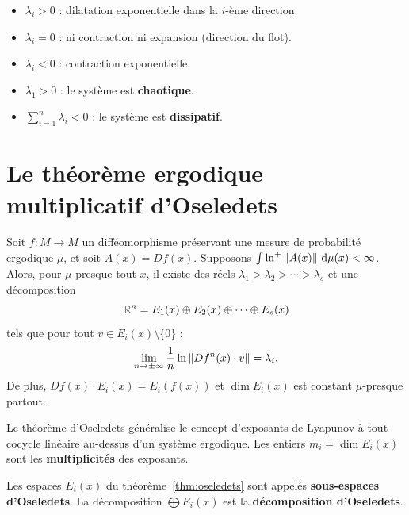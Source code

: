 \begin{formules}[title=\textbf{Interpr\'etation g\'eom\'etrique des exposants}]
\begin{itemize}
    \item $\lambda_i > 0$ : dilatation exponentielle dans la $i$-\`eme direction.
    \item $\lambda_i = 0$ : ni contraction ni expansion (direction du flot).
    \item $\lambda_i < 0$ : contraction exponentielle.
    \item $\lambda_1 > 0$ : le syst\`eme est \textbf{chaotique}.
    \item $\sum_{i=1}^n \lambda_i < 0$ : le syst\`eme est \textbf{dissipatif}.
\end{itemize}
\end{formules}

\section{Le th\'eor\`eme ergodique multiplicatif d'Oseledets}

\begin{theoreme}[Oseledets, 1968]
\label{thm:oseledets}
Soit $f : M \to M$ un diff\'eomorphisme pr\'eservant une mesure de probabilit\'e
ergodique $\mu$, et soit $A(x) = Df(x)$. Supposons
$\int \ln^+ \left\| A(x) \right\| \, \mathrm{d}\mu(x) < \infty$. Alors, pour
$\mu$-presque tout $x$, il existe des r\'eels
$\lambda_1 > \lambda_2 > \cdots > \lambda_s$ et une d\'ecomposition
\[
    \mathbb{R}^n = E_1(x) \oplus E_2(x) \oplus \cdots \oplus E_s(x)
\]
tels que pour tout $v \in E_i(x) \setminus \{0\}$ :
\[
    \lim_{n \to \pm\infty} \frac{1}{n} \ln \left\| Df^n(x) \cdot v \right\| = \lambda_i.
\]
De plus, $Df(x) \cdot E_i(x) = E_i(f(x))$ et $\dim E_i(x)$ est constant
$\mu$-presque partout.
\end{theoreme}

\begin{remarque}
Le th\'eor\`eme d'Oseledets g\'en\'eralise le concept d'exposants de Lyapunov
\`a tout cocycle lin\'eaire au-dessus d'un syst\`eme ergodique. Les entiers
$m_i = \dim E_i(x)$ sont les \textbf{multiplicit\'es} des exposants.
\end{remarque}

\begin{definition}
Les espaces $E_i(x)$ du th\'eor\`eme~\ref{thm:oseledets} sont appel\'es
\textbf{sous-espaces d'Oseledets}. La
d\'ecomposition $\bigoplus E_i(x)$ est la \textbf{d\'ecomposition d'Oseledets}.
\end{definition}

